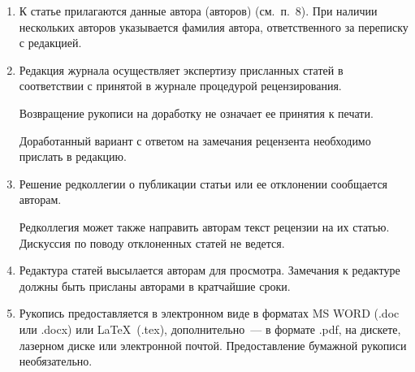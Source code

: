 {\begin{enumerate}[1.]
{\bfseries\textit{Соглашение о передаче права на публикацию:}}

\noindent
<<\textit{Мы, нижеподписавшиеся, авторы рукописи <<\ldots>>, передаем учредителям 
и редколлегии журнала <<Информатика и её применения>> неисключительное 
право опубликовать данную рукопись статьи на русском языке как в печатной, так и в 
электронной версиях журнала. Мы подтверждаем, что данная публикация не нарушает 
авторского права других лиц или организаций.} 
 
\textit{Подписи авторов: (ф. и. о., дата, адрес)>>.}
  
 
Это соглашение может быть представлено в бумажном виде или в виде 
отсканированной копии (с~подписями авторов).  
 

Редколлегия вправе запросить у авторов экспертное заключение о возможности 
пуб\-ли\-ка\-ции пред\-став\-лен\-ной статьи в открытой печати.\\[-13.5pt]  

\item К статье прилагаются данные автора (авторов) (см.\ п.~8). При наличии нескольких 
авторов указывается фамилия автора, ответственного за переписку с редакцией.\\[-13.5pt]  

\item Редакция журнала осуществляет экспертизу присланных статей в соответствии с 
принятой в журнале процедурой рецензирования.

Возвращение рукописи на доработку не означает ее принятия к печати.  

Доработанный вариант с ответом на замечания рецензента необходимо прислать в 
редакцию.\\[-13.5pt]  

\item Решение редколлегии о публикации статьи или ее отклонении сообщается авторам.  

Редколлегия может также направить авторам текст рецензии на их статью. Дискуссия по 
поводу отклоненных статей не ведется.\\[-13.5pt]  


\item Редактура статей высылается авторам для просмотра. Замечания к редактуре должны 
быть присланы авторами в кратчайшие сроки.\\[-13.5pt]  

\item Рукопись предоставляется в электронном виде в форматах MS WORD (.doc или 
.docx) или \LaTeX\  (.tex), дополнительно~--- в формате .pdf, на дискете, лазерном диске 
или электронной почтой. Предоставление бумажной рукописи необязательно.\\[-13.5pt] 


\end{enumerate}}
